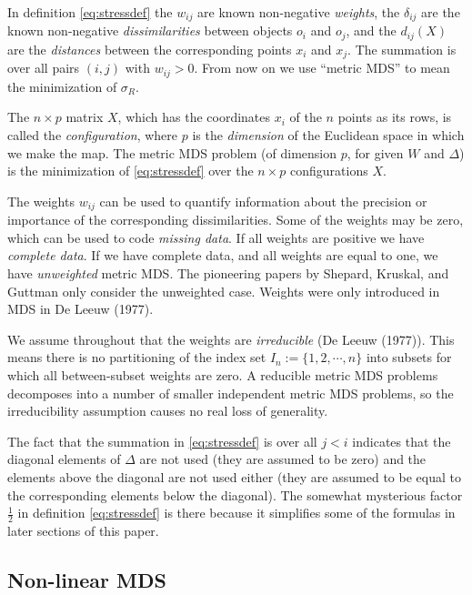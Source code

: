 \documentclass[
  12pt,
]{article}
\begin{document}
In definition
\eqref{eq:stressdef} the \(w_{ij}\) are known non-negative \emph{weights}, the
\(\delta_{ij}\) are the known non-negative \emph{dissimilarities} between
objects \(o_i\) and \(o_j\), and the \(d_{ij}(X)\) are the \emph{distances} between
the corresponding points \(x_i\) and \(x_j\). The summation is over all
pairs \((i,j)\) with \(w_{ij}>0\). From now on we use ``metric
MDS'' to mean the minimization of \(\sigma_R\).

The \(n\times p\) matrix \(X\), which has the coordinates \(x_i\) of the \(n\)
points as its rows, is called the \emph{configuration}, where \(p\) is the
\emph{dimension} of the Euclidean space in which we make the map.
The metric MDS problem (of dimension \(p\), for given \(W\)
and \(\Delta\)) is the minimization of \eqref{eq:stressdef} over the
\(n\times p\) configurations \(X\).

The weights \(w_{ij}\) can be used to quantify information about the
precision or importance of the corresponding dissimilarities. Some of
the weights may be zero, which can be used to code \emph{missing data}. If
all weights are positive we have \emph{complete data}. If we have complete
data, and all weights are equal to one, we have \emph{unweighted} metric MDS.
The pioneering papers by Shepard, Kruskal, and Guttman only consider the
unweighted case. Weights were only introduced in MDS in De Leeuw (1977).

We assume throughout that the weights are \emph{irreducible} (De Leeuw (1977)).
This means there is no partitioning of the index set
\(I_n:=\{1,2,\cdots,n\}\) into subsets for which all between-subset
weights are zero. A reducible metric MDS problems decomposes into a
number of smaller independent metric MDS problems, so the irreducibility
assumption causes no real loss of generality.

The fact that the summation in \eqref{eq:stressdef} is over all \(j<i\)
indicates that the diagonal elements of \(\Delta\) are not used (they are
assumed to be zero) and the elements above the diagonal are not used either
(they are assumed to be equal to the corresponding elements below
the diagonal). The somewhat mysterious factor \(\frac12\) in definition
\eqref{eq:stressdef} is there because it simplifies some of the formulas
in later sections of this paper.

\subsection{Non-linear MDS}\label{non-linear-mds}
\end{document}
